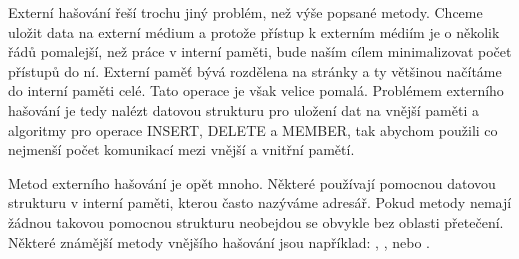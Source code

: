 Externí hašování řeší trochu jiný problém, než výše popsané metody. Chceme
uložit data na externí médium a protože přístup k externím médiím je o několik
řádů pomalejší, než práce v interní paměti, bude naším cílem minimalizovat počet
přístupů do ní. Externí paměť bývá rozdělena na stránky a ty většinou načítáme
do interní paměti celé. Tato operace je však velice pomalá. Problémem externího
hašování je tedy nalézt datovou strukturu pro uložení dat na vnější paměti a
algoritmy pro operace INSERT, DELETE a MEMBER, tak abychom použili co nejmenší
počet komunikací mezi vnější a vnitřní pamětí.

Metod externího hašování je opět mnoho. Některé používají pomocnou datovou
strukturu v interní paměti, kterou často nazýváme adresář. Pokud metody nemají
žádnou takovou pomocnou strukturu neobejdou se obvykle bez oblasti přetečení.
Některé známější metody vnějšího hašování jsou například: , ,  nebo . 
